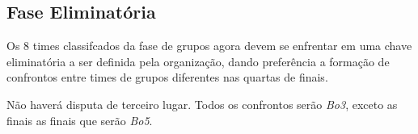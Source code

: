 \subsection{Fase Eliminatória}

Os 8 times classifcados da fase de grupos agora devem se enfrentar em uma chave eliminatória a ser definida pela organização, dando preferência a formação de confrontos entre times de grupos diferentes nas quartas de finais.

Não haverá disputa de terceiro lugar. Todos os confrontos serão \textit{Bo3}, exceto as finais as finais que serão \textit{Bo5}.
